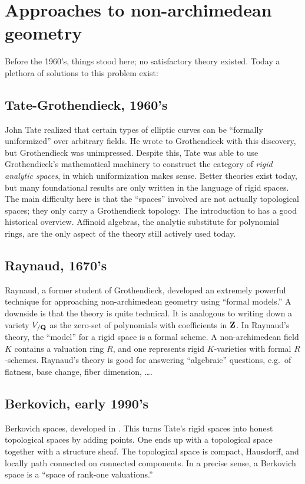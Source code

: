 \section{Approaches to non-archimedean geometry}

Before the 1960's, things stood here; no satisfactory theory existed. Today 
a plethora of solutions to this problem exist:

\subsection{Tate-Grothendieck, 1960's}
John Tate realized that certain types of 
elliptic curves can be ``formally uniformized'' over arbitrary fields. He wrote 
to Grothendieck with this discovery, but Grothendieck was unimpressed. Despite 
this, Tate was able to use Grothendieck's mathematical machinery to construct 
the category of \emph{rigid analytic spaces}, in which uniformization makes 
sense. Better theories exist today, but many foundational results are only 
written in the language of rigid spaces. The main difficulty here is that the 
``spaces'' involved are not actually topological spaces; they only carry a 
Grothendieck topology. The introduction to \cite{aws-2008} has a good 
historical overview. Affinoid algebras, the analytic substitute for polynomial 
rings, are the only aspect of the theory still actively used today. 

\subsection{Raynaud, 1670's}
Raynaud, a former student of Grothendieck, developed an extremely 
powerful technique for approaching non-archimedean geometry using ``formal 
models.'' A downside is that the theory is quite technical. It is analogous to 
writing down a variety $V_{/\mathbf{Q}}$ as the zero-set of polynomials with 
coefficients in $\mathbf{Z}$. In Raynaud's theory, the ``model'' for a rigid space is 
a formal scheme. A non-archimedean field $K$ contains a valuation ring $R$, and 
one represents rigid $K$-varieties with formal $R$-schemes. Raynaud's theory is 
good for answering ``algebraic'' questions, e.g.~of flatness, base change, 
fiber dimension, \ldots. 

\subsection{Berkovich, early 1990's}
Berkovich spaces, developed in \cite{berkovich-1990}. This turns Tate's 
rigid spaces into honest topological spaces by adding points. One ends up with 
a topological space together with a structure sheaf. The topological space is 
compact, Hausdorff, and locally path connected on connected components. In a 
precise sense, a Berkovich space is a ``space of rank-one valuations.'' 

